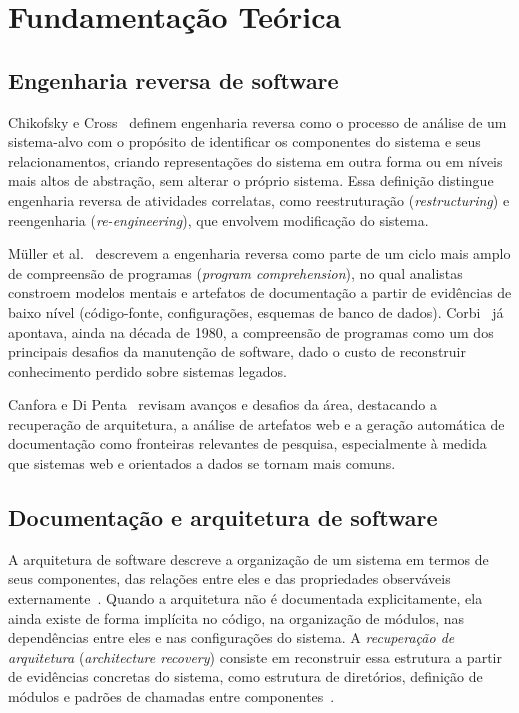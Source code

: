 \documentclass[12pt]{article}
\begin{document}
\section{Fundamentação Teórica}
\label{sec:fundamentacao}

\subsection{Engenharia reversa de software}

Chikofsky e Cross~\cite{chikofsky1990} definem engenharia reversa como o
processo de análise de um sistema-alvo com o propósito de identificar os
componentes do sistema e seus relacionamentos, criando representações do
sistema em outra forma ou em níveis mais altos de abstração, sem alterar o
próprio sistema. Essa definição distingue engenharia reversa de atividades
correlatas, como reestruturação (\emph{restructuring}) e reengenharia
(\emph{re-engineering}), que envolvem modificação do sistema.

Müller et al.~\cite{muller2000} descrevem a engenharia reversa como parte de
um ciclo mais amplo de compreensão de programas (\emph{program
comprehension}), no qual analistas constroem modelos mentais e artefatos de
documentação a partir de evidências de baixo nível (código-fonte,
configurações, esquemas de banco de dados). Corbi~\cite{corbi1989} já
apontava, ainda na década de 1980, a compreensão de programas como um dos
principais desafios da manutenção de software, dado o custo de reconstruir
conhecimento perdido sobre sistemas legados.

Canfora e Di Penta~\cite{canfora2007} revisam avanços e desafios da área,
destacando a recuperação de arquitetura, a análise de artefatos web e a
geração automática de documentação como fronteiras relevantes de pesquisa,
especialmente à medida que sistemas web e orientados a dados se tornam mais
comuns.

\subsection{Documentação e arquitetura de software}

A arquitetura de software descreve a organização de um sistema em termos de
seus componentes, das relações entre eles e das propriedades observáveis
externamente~\cite{bass2012}. Quando a arquitetura não é documentada
explicitamente, ela ainda existe de forma implícita no código, na
organização de módulos, nas dependências entre eles e nas configurações do
sistema. A \emph{recuperação de arquitetura} (\emph{architecture recovery})
consiste em reconstruir essa estrutura a partir de evidências concretas do
sistema, como estrutura de diretórios, definição de módulos e padrões de
chamadas entre componentes~\cite{koschke2009}.
\end{document}

